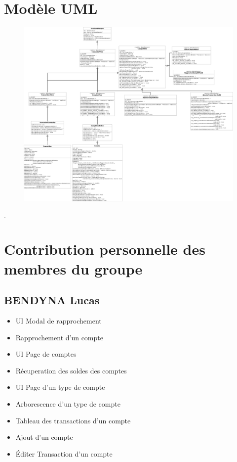 \documentclass[10pt,a4paper,openany]{report}
\begin{document}
	\section{Modèle UML}
	\begin{figure}[H]
		\begin{center}
			\includegraphics[width = 1\textwidth]{UML.PNG}
		\end{center} 
	\end{figure}.
	
	\section{Contribution personnelle des membres du groupe}

	\subsection{BENDYNA Lucas}
	\begin{itemize}
		\item UI Modal de rapprochement
		\item Rapprochement d'un compte
		\item UI Page de comptes
		\item Récuperation des soldes des comptes
		\item UI Page d'un type de compte
		\item Arborescence d'un type de compte
		\item Tableau des transactions d'un compte
		\item Ajout d'un compte
		\item Éditer Transaction d'un compte
	\end{itemize}
\end{document}
